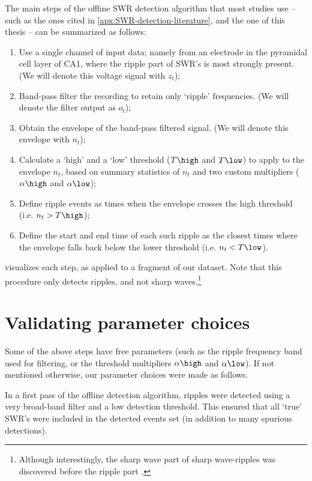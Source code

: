 The main steps of the offline SWR detection algorithm that most studies use -- such as the ones cited in \cref{apx:SWR-detection-literature}, and the one of this thesis -- can be summarized as follows:
\begin{enumerate}
\item Use a single channel of input data; namely from an electrode in the pyramidal cell layer of CA1, where the ripple part of SWR's is most strongly present. (We will denote this voltage signal with $z_t$);
\item Band-pass filter the recording to retain only `ripple' frequencies. (We will denote the filter output as $o_t$);
\item Obtain the envelope of the band-pass filtered signal. (We will denote this envelope with $n_t$);
\item Calculate a `high' and a `low' threshold ($T\high$ and $T\low$) to apply to the envelope $n_t$, based on summary statistics of $n_t$ and two custom multipliers ($\alpha\high$ and $\alpha\low$);
\item Define ripple events as times when the envelope crosses the high threshold (i.e. $n_t > T\high$);
\item Define the start and end time of each such ripple as the closest times where the envelope falls back below the lower threshold (i.e. $n_t < T\low$).
\end{enumerate}

 visualizes each step, as applied to a fragment of our dataset. Note that this procedure only detects ripples, and not sharp waves.\footnote{Although interestingly, the sharp wave part of sharp wave-ripples was discovered before the ripple part \cite[p. 1]{Buzsaki2015}.}




\section{Validating parameter choices}
\label{sec:validating-parameter-choices}

Some of the above steps have free parameters (such as the ripple frequency band used for filtering, or the threshold multipliers $\alpha\high$ and $\alpha\low$). If not mentioned otherwise, our parameter choices were made as follows.

In a first pass of the offline detection algorithm, ripples were detected using a very broad-band filter and a low detection threshold. This ensured that all `true' SWR's were included in the detected events set (in addition to many spurious detections).

